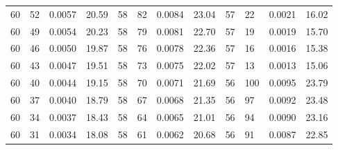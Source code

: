 \begin{tabular}{llll|llll|llll}
60 & 52 & 0.0057 & 20.59 & 58 & 82 & 0.0084 & 23.04 & 57 & 22 & 0.0021 & 16.02\\
60 & 49 & 0.0054 & 20.23 & 58 & 79 & 0.0081 & 22.70 & 57 & 19 & 0.0019 & 15.70\\
60 & 46 & 0.0050 & 19.87 & 58 & 76 & 0.0078 & 22.36 & 57 & 16 & 0.0016 & 15.38\\
60 & 43 & 0.0047 & 19.51 & 58 & 73 & 0.0075 & 22.02 & 57 & 13 & 0.0013 & 15.06\\
60 & 40 & 0.0044 & 19.15 & 58 & 70 & 0.0071 & 21.69 & 56 & 100 & 0.0095 & 23.79\\
60 & 37 & 0.0040 & 18.79 & 58 & 67 & 0.0068 & 21.35 & 56 & 97 & 0.0092 & 23.48\\
60 & 34 & 0.0037 & 18.43 & 58 & 64 & 0.0065 & 21.01 & 56 & 94 & 0.0090 & 23.16\\
60 & 31 & 0.0034 & 18.08 & 58 & 61 & 0.0062 & 20.68 & 56 & 91 & 0.0087 & 22.85\\
\bottomrule
\end{tabular}
\newpage
